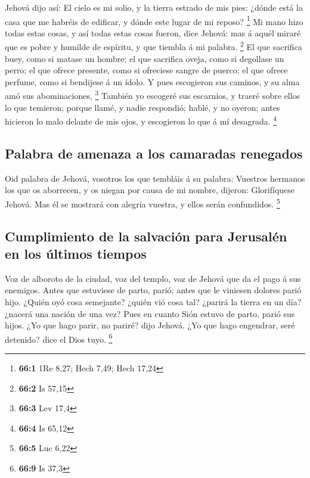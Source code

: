  Jehová dijo así: El cielo es mi solio, y la tierra
estrado de mis pies: ¿dónde está la casa que me habréis de edificar, y
dónde este lugar de mi reposo? \footnote{\textbf{66:1} 1Re 8,27; Hech
  7,49; Hech 17,24}  Mi mano hizo todas estas cosas, y así
todas estas cosas fueron, dice Jehová: mas á aquél miraré que es pobre y
humilde de espíritu, y que tiembla á mi palabra. \footnote{\textbf{66:2}
  Is 57,15}  El que sacrifica buey, como si matase un
hombre; el que sacrifica oveja, como si degollase un perro; el que
ofrece presente, como si ofreciese sangre de puerco; el que ofrece
perfume, como si bendijese á un ídolo. Y pues escogieron sus caminos, y
su alma amó sus abominaciones, \footnote{\textbf{66:3} Lev 17,4}
 También yo escogeré sus escarnios, y traeré sobre ellos
lo que temieron; porque llamé, y nadie respondió; hablé, y no oyeron;
antes hicieron lo malo delante de mis ojos, y escogieron lo que á mí
desagrada. \footnote{\textbf{66:4} Is 65,12}

\hypertarget{palabra-de-amenaza-a-los-camaradas-renegados}{%
\subsection{Palabra de amenaza a los camaradas
renegados}\label{palabra-de-amenaza-a-los-camaradas-renegados}}

 Oid palabra de Jehová, vosotros los que tembláis á su
palabra: Vuestros hermanos los que os aborrecen, y os niegan por causa
de mi nombre, dijeron: Glorifíquese Jehová. Mas él se mostrará con
alegría vuestra, y ellos serán confundidos. \footnote{\textbf{66:5} Luc
  6,22}

\hypertarget{cumplimiento-de-la-salvaciuxf3n-para-jerusaluxe9n-en-los-uxfaltimos-tiempos}{%
\subsection{Cumplimiento de la salvación para Jerusalén en los últimos
tiempos}\label{cumplimiento-de-la-salvaciuxf3n-para-jerusaluxe9n-en-los-uxfaltimos-tiempos}}

 Voz de alboroto de la ciudad, voz del templo, voz de
Jehová que da el pago á sus enemigos.  Antes que estuviese
de parto, parió; antes que le viniesen dolores parió hijo.
 ¿Quién oyó cosa semejante? ¿quién vió cosa tal? ¿parirá
la tierra en un día? ¿nacerá una nación de una vez? Pues en cuanto Sión
estuvo de parto, parió sus hijos.  ¿Yo que hago parir, no
pariré? dijo Jehová. ¿Yo que hago engendrar, seré detenido? dice el Dios
tuyo. \footnote{\textbf{66:9} Is 37,3}

